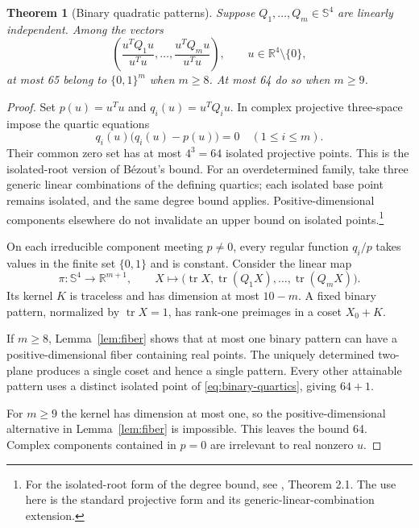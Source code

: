 \documentclass[11pt]{article}
\newtheorem{theorem}{Theorem}[section]
\theoremstyle{remark}\newtheorem{remark}[theorem]{Remark}
\newcommand{\Sym}{\mathbb S}
\newcommand{\R}{\mathbb R}
\newcommand{\tr}{\operatorname{tr}}
\begin{document}
\begin{theorem}[Binary quadratic patterns]\label{thm:binary}
Suppose $Q_1,\ldots,Q_m\in\Sym^4$ are linearly independent. Among the vectors
\begin{equation}\label{eq:binary-map}
 \left(\frac{u^TQ_1u}{u^Tu},\ldots,
       \frac{u^TQ_mu}{u^Tu}\right),\qquad u\in\R^4\setminus\{0\},
\end{equation}
at most 65 belong to $\{0,1\}^m$ when $m\geq8$. At most 64 do so when $m\geq9$.
\end{theorem}
\begin{proof}
Set $p(u)=u^Tu$ and $q_i(u)=u^TQ_i u$. In complex projective three-space impose the quartic equations
\begin{equation}\label{eq:binary-quartics}
 q_i(u)\bigl(q_i(u)-p(u)\bigr)=0\quad(1\leq i\leq m).
\end{equation}
Their common zero set has at most $4^3=64$ isolated projective points. This is the isolated-root version of B\'ezout's bound. For an overdetermined family, take three generic linear combinations of the defining quartics; each isolated base point remains isolated, and the same degree bound applies. Positive-dimensional components elsewhere do not invalidate an upper bound on isolated points.\footnote{For the isolated-root form of the degree bound, see \cite{bezout}, Theorem 2.1. The use here is the standard projective form and its generic-linear-combination extension.}

On each irreducible component meeting $p\ne0$, every regular function $q_i/p$ takes values in the finite set $\{0,1\}$ and is constant. Consider the linear map
\[
 \pi:\Sym^4\longrightarrow\R^{m+1},\qquad
 X\longmapsto\bigl(\tr X,\tr(Q_1X),\ldots,\tr(Q_mX)\bigr).
\]
Its kernel $K$ is traceless and has dimension at most $10-m$. A fixed binary pattern, normalized by $\tr X=1$, has rank-one preimages in a coset $X_0+K$.

If $m\geq8$, Lemma~\ref{lem:fiber} shows that at most one binary pattern can have a positive-dimensional fiber containing real points. The uniquely determined two-plane produces a single coset and hence a single pattern. Every other attainable pattern uses a distinct isolated point of \eqref{eq:binary-quartics}, giving $64+1$.

For $m\geq9$ the kernel has dimension at most one, so the positive-dimensional alternative in Lemma~\ref{lem:fiber} is impossible. This leaves the bound 64. Complex components contained in $p=0$ are irrelevant to real nonzero $u$.
\end{proof}
\end{document}
